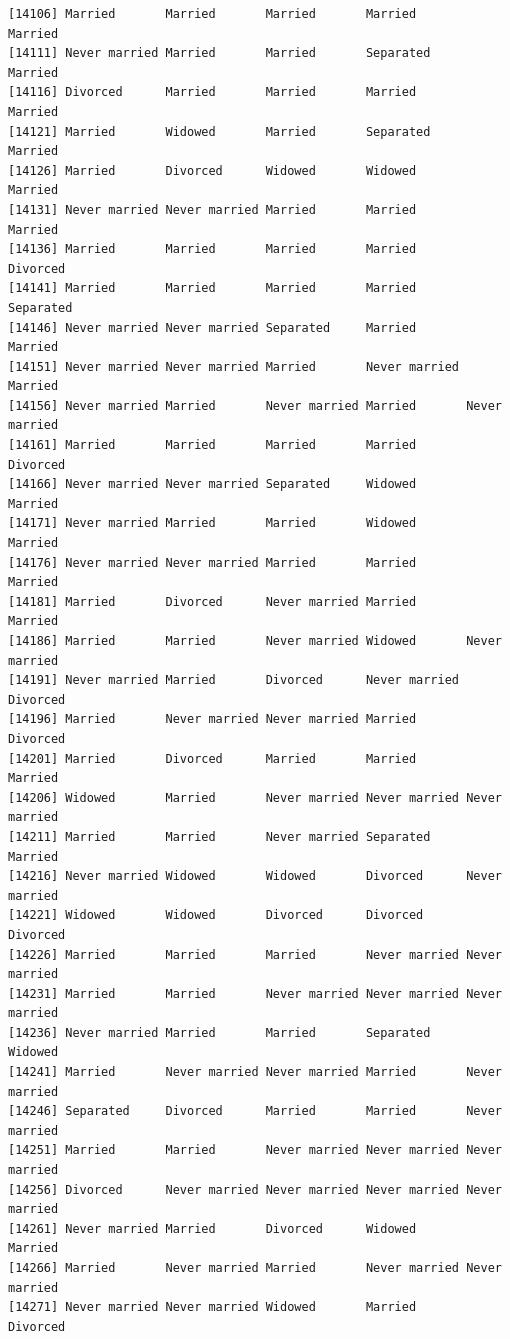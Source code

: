 \documentclass[
  letterpaper,
  DIV=11,
  numbers=noendperiod,
  oneside]{scrartcl}
\begin{document}
\begin{verbatim}
[14106] Married       Married       Married       Married       Married      
[14111] Never married Married       Married       Separated     Married      
[14116] Divorced      Married       Married       Married       Married      
[14121] Married       Widowed       Married       Separated     Married      
[14126] Married       Divorced      Widowed       Widowed       Married      
[14131] Never married Never married Married       Married       Married      
[14136] Married       Married       Married       Married       Divorced     
[14141] Married       Married       Married       Married       Separated    
[14146] Never married Never married Separated     Married       Married      
[14151] Never married Never married Married       Never married Married      
[14156] Never married Married       Never married Married       Never married
[14161] Married       Married       Married       Married       Divorced     
[14166] Never married Never married Separated     Widowed       Married      
[14171] Never married Married       Married       Widowed       Married      
[14176] Never married Never married Married       Married       Married      
[14181] Married       Divorced      Never married Married       Married      
[14186] Married       Married       Never married Widowed       Never married
[14191] Never married Married       Divorced      Never married Divorced     
[14196] Married       Never married Never married Married       Divorced     
[14201] Married       Divorced      Married       Married       Married      
[14206] Widowed       Married       Never married Never married Never married
[14211] Married       Married       Never married Separated     Married      
[14216] Never married Widowed       Widowed       Divorced      Never married
[14221] Widowed       Widowed       Divorced      Divorced      Divorced     
[14226] Married       Married       Married       Never married Never married
[14231] Married       Married       Never married Never married Never married
[14236] Never married Married       Married       Separated     Widowed      
[14241] Married       Never married Never married Married       Never married
[14246] Separated     Divorced      Married       Married       Never married
[14251] Married       Married       Never married Never married Never married
[14256] Divorced      Never married Never married Never married Never married
[14261] Never married Married       Divorced      Widowed       Married      
[14266] Married       Never married Married       Never married Never married
[14271] Never married Never married Widowed       Married       Divorced     

\end{verbatim}
\end{document}
